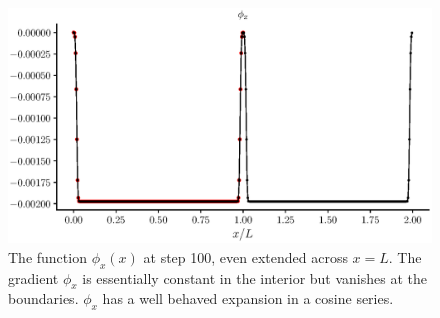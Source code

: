\documentclass{jfm}
\begin{document}
 \begin{figure}
  \centerline{\includegraphics[width=1.0\textwidth]{FIGS/explicit_100steps/pressure_gradient.eps}}
  \caption{The function $\phi_x(x)$ at step 100, even extended across $x=L$. The gradient $\phi_x$  is essentially constant in the interior but vanishes at the boundaries. $\phi_x$ has a well behaved expansion in a cosine series.  }
  \label{fig:pgrad2}
\end{figure}
\end{document}
